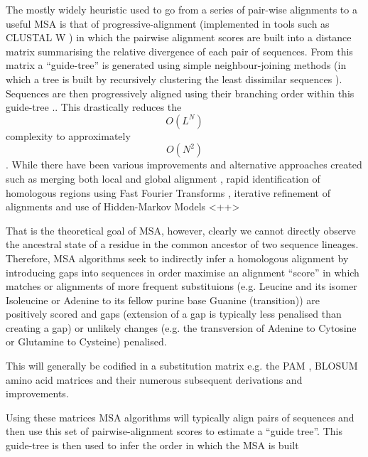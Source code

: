 The mostly widely heuristic used to go from a series of pair-wise alignments to
a useful MSA is that of progressive-alignment \citep{Feng1987} (implemented in 
tools such as CLUSTAL W \citep{Thompson1994}) in which the pairwise alignment
scores are built into a distance matrix summarising the relative divergence of 
each pair of sequences. From this matrix a ``guide-tree'' is generated using simple
neighbour-joining methods (in which a tree is built by recursively clustering
the least dissimilar sequences \citep{Saitou1987}).  Sequences are then progressively
aligned using their branching order within this guide-tree \citep{Thompson1994}..
This drastically reduces the \[O(L^{N})\] complexity to approximately \[O(N^{2})\]
\citep{Sievers2011}. While there have been various improvements and alternative approaches
created such as merging both local and global alignment \citep{Notredame2000}, 
rapid identification of homologous regions using Fast Fourier Transforms \citep{Katoh2002},
iterative refinement of alignments \citep{Edgar2004a} and use of Hidden-Markov Models \citep{}<++>







That is the theoretical goal of MSA, however, clearly we cannot directly observe
the ancestral state of a residue in the common ancestor of two sequence lineages.
Therefore, MSA algorithms seek to indirectly infer a homologous alignment by 
introducing gaps into sequences in order maximise
an alignment ``score'' in which matches or alignments of more frequent
substituions (e.g. Leucine and its isomer Isoleucine or Adenine to its fellow purine base
Guanine (transition)) are positively scored and gaps (extension of a gap is typically
less penalised than creating a gap) or unlikely changes (e.g. the transversion
of Adenine to Cytosine or Glutamine to Cysteine) penalised.

This will generally be codified in a substitution matrix e.g. the PAM \citep{Dayhoff1978}, 
BLOSUM \citep{Henikoff1992} amino acid matrices and their numerous subsequent
derivations and improvements. 




Using these matrices MSA algorithms will typically
align pairs of sequences and then use this set of pairwise-alignment scores
to estimate a ``guide tree''.  This guide-tree is then used to infer the order 
in which the MSA is built








